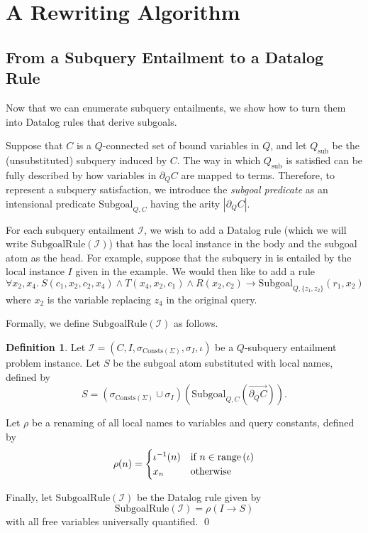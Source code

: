 \documentclass[12pt]{report}
\theoremstyle{plain}
\theoremstyle{definition}
\newtheorem{definition}[theorem]{Definition}
\def\Consts{{\mathrm{Consts}}}
\newcommand{\range}[1]{\ensuremath{\normalfont{\operatorname{range}} \left( #1 \right)}}
\begin{document}
\section{A Rewriting Algorithm}
\label{a-rewriting-algorithm}

\subsection{From a Subquery Entailment to a Datalog Rule}
\label{subquery-entailment-to-datalog-rule}

Now that we can enumerate subquery entailments, we show how to turn them into Datalog rules that derive subgoals.

Suppose that $C$ is a $Q$-connected set of bound variables in $Q$, and let $Q_\mathrm{sub}$ be the (unsubstituted) subquery induced by $C$. The way in which $Q_\mathrm{sub}$ is satisfied can be fully described by how variables in $\partial_Q C$ are mapped to terms. Therefore, to represent a subquery satisfaction, we introduce the \emph{subgoal predicate} as an intensional predicate $\mathrm{Subgoal}_{Q, C}$ having the arity $|\partial_Q C|$.

For each subquery entailment $\mathcal{I}$, we wish to add a Datalog rule (which we will write $\mathrm{SubgoalRule}(\mathcal{I})$) that has the local instance in the body and the subgoal atom as the head.
For example, suppose that the subquery in  is entailed by the local instance $I$ given in the example. We would then like to add a rule $$
  \forall x_2, x_4.\ S(c_1, x_2, c_2, x_4) \wedge T(x_4, x_2, c_1) \wedge R(x_2, c_2) \rightarrow \mathrm{Subgoal}_{Q, \{z_1, z_2\}}(r_1, x_2)
$$
where $x_2$ is the variable replacing $z_4$ in the original query.

Formally, we define $\mathrm{SubgoalRule}(\mathcal{I})$ as follows.

\begin{definition}
\label{definition:subgoal-rule}
  Let $\mathcal{I} = (C, I, \sigma_{\Consts(\Sigma)}, \sigma_I, \iota)$ be a $Q$-subquery entailment problem instance. Let $S$ be the subgoal atom substituted with local names, defined by $$
    S = (\sigma_{\Consts(\Sigma)} \cup \sigma_I)\left(\mathrm{Subgoal}_{Q, C}\left(\overrightarrow{\partial_Q C}\right)\right).
  $$

  Let $\rho$ be a renaming of all local names to variables and query constants, defined by $$
    \rho(n) = \begin{cases}
      \iota^{-1}(n) & \text{if } n \in \range{\iota} \\
      x_n & \text{otherwise}
    \end{cases}
  $$

  Finally, let $\mathrm{SubgoalRule}(\mathcal{I})$ be the Datalog rule given by $$
    \mathrm{SubgoalRule}(\mathcal{I}) = \rho\left(I \rightarrow S\right)
  $$ with all free variables universally quantified.
  \qed
\end{definition}
\end{document}
